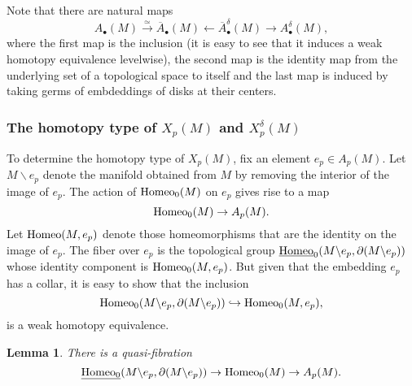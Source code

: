 \documentclass[a4paper]{amsart}
\newtheorem{lem}[thm]{Lemma}
\theoremstyle{definition}
\theoremstyle{remark}
\newcommand{\tH}{\text{\textnormal{Homeo}}}
\numberwithin{equation}{section}
\begin{document}
Note that there are natural maps $$A_{\bullet}(M)\xrightarrow{\simeq} \overline{A}_{\bullet}(M)\leftarrow \overline{A}^{\delta}_{\bullet}(M)\to A^{\delta}_{\bullet}(M) ,$$ where the first map is the inclusion (it is easy to see that it induces a weak homotopy equivalence levelwise), the second map is the identity map from the underlying set of a topological space to itself and the last map is induced by taking germs of embdeddings of disks at their centers.  

\subsubsection{The homotopy type of $X_p(M)$ and $X_p^{\delta}(M)$} To determine the homotopy type of $X_p(M)$, fix an element $e_p\in  A_p(M)$. Let $M\backslash e_p$ denote the manifold obtained from $M$ by removing the interior of the image of $e_p$. The action of $\tH_0(M)$ on $e_p$ gives rise to a map 
\begin{equation}
\tH_0(M)\to A_p(M).
\end{equation}
  Let $\tH(M,e_p)$ denote those homeomorphisms that are the identity on the image of $e_p$. The fiber over $e_p$ is the topological group $\underline{\tH}_{0}(M\backslash e_p,\partial(M\backslash e_p))$ whose identity component is $\tH_0(M,e_p)$. But given that the embedding $e_p$ has a collar, it is easy to show that the inclusion 
\begin{equation}\label{e_p}\tH_{0}(M\backslash e_p,\partial(M\backslash e_p))\hookrightarrow \tH_0(M,e_p),\end{equation}
is a weak homotopy equivalence. 
\begin{lem}\label{quasi-fib}
There is a quasi-fibration
\begin{equation}\label{eq1}
\underline{\tH_{0}}(M\backslash e_p,\partial(M\backslash e_p))\to \tH_0(M)\to A_p(M).
\end{equation}
\end{lem}
\end{document}
